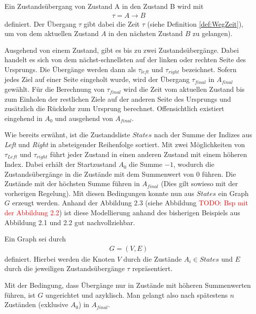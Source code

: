 \documentclass[german,version-2019-11]{uzl-thesis}
\begin{document}
\begin{definition}
Ein Zustandsübergang von Zustand A in den Zustand B wird mit
\begin{align*}
\tau = A\rightarrow B
\end{align*}
definiert. Der Übergang $\tau$ gibt dabei die Zeit $\tau$ (siehe Definition \ref{def:WegZeit}), um von dem aktuellen Zustand $A$ in den nächsten Zustand $B$ zu gelangen).
\end{definition}

Ausgehend von einem Zustand, gibt es bis zu zwei Zustandsübergänge. Dabei handelt es sich von dem nächst-schnellsten auf der linken oder rechten Seite des Ursprungs. Die Übergänge werden dann als $\tau_{left}$ und $\tau_{right}$ bezeichnet. Sofern jedes Ziel auf einer Seite eingeholt wurde, wird der Übergang $\tau_{final}$ in $A_{final}$ gewählt. Für die Berechnung von $\tau_{final}$ wird die Zeit vom aktuellen Zustand bis zum Einholen der restlichen Ziele auf der anderen Seite des Ursprungs und zusätzlich die Rückkehr zum Ursprung berechnet. Offensichtlich existiert eingehend in $A_0$ und ausgehend von $A_{final}$. 

Wie bereits erwähnt, ist die Zustandsliste $States$ nach der Summe der Indizes aus \emph{Left} und \emph{Right} in absteigender Reihenfolge sortiert. Mit zwei Möglichkeiten von $\tau_{Left}$ und $\tau_{right}$ führt jeder Zustand in einen anderen Zustand mit einem höheren Index. Dabei erhält der Startzustand $A_0$ die Summe $-1$, wodurch die Zustandsübergänge in die Zustände mit dem Summenwert von $0$ führen. Die Zustände mit der höchsten Summe führen in $A_{final}$ (Dies gilt sowieso mit der vorherigen Regelung). Mit diesen Bedingungen konnte nun aus $States$ ein Graph $G$ erzeugt werden. Anhand der Abbildung 2.3 (siehe Abbildung \textcolor{red}{TODO: Bsp mit der Abbildung 2.2}) ist diese Modellierung anhand des bisherigen Beispiels aus Abbildung 2.1 und 2.2 gut nachvollziehbar.

\begin{definition}
Ein Graph sei durch
\begin{align*}
G = (V,E)
\end{align*}
definiert. Hierbei werden die Knoten $V$ durch die Zustände $A_i \in States$ und $E$ durch die jeweiligen Zustandsübergänge $\tau$ repräsentiert.
\end{definition}

Mit der Bedingung, dass Übergänge nur in Zustände mit höheren Summenwerten führen, ist $G$ ungerichtet und azyklisch. Man gelangt also nach spätestens $n$ Zuständen (exklusive $A_0$) in $A_{final}$. 
\end{document}
